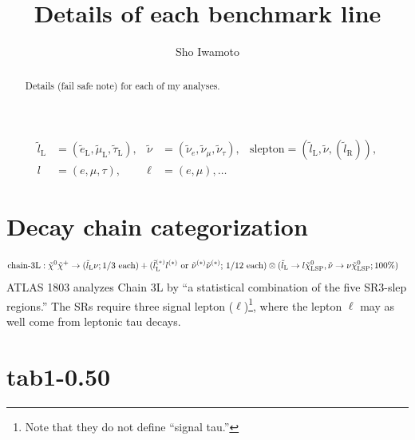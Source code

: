 \documentclass[a4paper,10pt,captions=tableheading,DIV=14]{scrartcl}
\author{Sho Iwamoto}
\title{Details of each benchmark line}
\numberwithin{equation}{section}
\newcommand\w[1]{_{\mathrm{#1}}}
\newcommand\lL{\tilde l\w L}
\newcommand\lR{\tilde l\w R}
\newcommand\neut  [1][\relax]{{\tilde\chi^0_{#1}}}
\newcommand\charP [1][\relax]{{\tilde\chi^+_{#1}}}
\begin{document}
\begin{center}{\makeatletter
{\huge{}\@title}\par\vspace{2em}
{\Large \@author}\par\vspace{2em}
}
\begin{abstract}\noindent
Details (fail safe note) for each of my analyses.
\end{abstract}
\end{center}
\begin{align*}
\lL &= (\tilde e\w L, \tilde \mu\w L, \tilde\tau\w L),
&
\tilde\nu &= (\tilde \nu_e, \tilde\nu_\mu, \tilde\nu_\tau),
&
\text{slepton}=(\lL,\tilde\nu, (\lR)),
\\
l&=(e,\mu,\tau),
&
\ell&=(e,\mu),\dots
\end{align*}

\section{Decay chain categorization}

\begin{align}
 \text{chain-3L}&: \neut\charP\to(\lL \nu;\text{1/3 each})+(\lL^{(*)}l^{(*)} \text{ or }\tilde\nu^{(*)}\tilde\nu^{(*)}\text{; 1/12 each}) \otimes(\lL\to l\neut[\text{LSP}], \tilde \nu\to\nu\neut[\text{LSP}]; \text{100\%})
\end{align}
ATLAS 1803 analyzes Chain 3L by ``a statistical combination of the five SR3-slep regions.'' The SRs require three signal lepton ($\ell$)\footnote{Note that they do not define ``signal tau.''}, where the lepton $\ell$ may as well come from leptonic tau decays.


\section{tab1-0.50}
\end{document}
